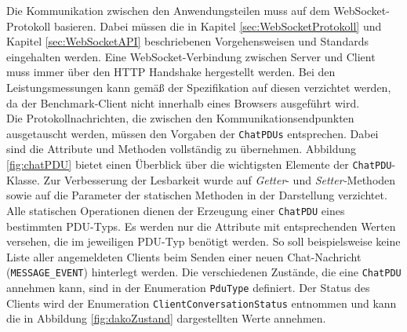 \documentclass[11pt,a4paper,titlepage]{scrartcl}
\numberwithin{equation}{section}
\begin{document}
\noindent Die Kommunikation zwischen den Anwendungsteilen muss auf dem WebSocket-Protokoll basieren. Dabei müssen die in Kapitel \ref{sec:WebSocketProtokoll} und Kapitel \ref{sec:WebSocketAPI} beschriebenen Vorgehensweisen und Standards eingehalten werden. Eine WebSocket-Verbindung zwischen Server und Client muss immer über den HTTP Handshake hergestellt werden. Bei den Leistungsmessungen kann gemäß der Spezifikation auf diesen verzichtet werden, da der Benchmark-Client nicht innerhalb eines Browsers ausgeführt wird. \\

\noindent Die Protokollnachrichten, die zwischen den Kommunikationsendpunkten ausgetauscht werden, müssen den Vorgaben der \texttt{ChatPDUs} entsprechen. Dabei sind die Attribute und Methoden vollständig zu übernehmen. Abbildung \ref{fig:chatPDU} bietet einen Überblick über die wichtigsten Elemente der \texttt{ChatPDU}-Klasse. Zur Verbesserung der Lesbarkeit wurde auf \textit{Getter}- und \textit{Setter-}Methoden sowie auf die Parameter der statischen Methoden in der Darstellung verzichtet. Alle statischen Operationen dienen der Erzeugung einer \texttt{ChatPDU} eines bestimmten PDU-Typs. Es werden nur die Attribute mit entsprechenden Werten versehen, die im jeweiligen PDU-Typ benötigt werden. So soll beispielsweise keine Liste aller angemeldeten Clients beim Senden einer neuen Chat-Nachricht (\texttt{MESSAGE\_EVENT}) hinterlegt werden. Die verschiedenen Zustände, die eine \texttt{ChatPDU} annehmen kann, sind in der Enumeration \texttt{PduType} definiert. Der Status des Clients wird der Enumeration \texttt{ClientConversationStatus} entnommen und kann die in Abbildung \ref{fig:dakoZustand} dargestellten Werte annehmen. 
\medskip
\end{document}
